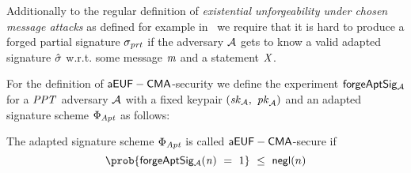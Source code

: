 \begin{definition}[$\cnstaEUFCMA$]\label{def:aeufcma}
Additionally to the regular definition of \textit{existential unforgeability under chosen message attacks} as defined for example in~\cite{vaudenay2006classical} we require that it is hard to produce a forged partial signature $\sigma_{\mathit{prt}}$ if the
adversary $\mathcal{A}$ gets to know a valid adapted signature $\hat{\sigma}$ w.r.t. some message $\mathit{m}$ and a statement $\mathit{X}$.

For the definition of $\cnstaEUFCMA$-security we define the experiment $\mathsf{forgeAptSig_{\mathcal{A}}}$ for a $\mathit{PPT}$ adversary $\mathcal{A}$ with a fixed keypair $(\mathit{sk}_{\mathcal{A}} ,~ \mathit{pk}_{\mathcal{A}})$ and an adapted signature scheme $\Phi_{\mathit{Apt}}$ as
follows:

\begin{center}
    \fbox{
    \begin{varwidth}{\textwidth}
        \procedure[linenumbering]{$\procExpForg{\varN}$} {
        \varSet \opAssign \cnstEmptySet \\
        \varMsg \opFunResult \cnstAdversary^{\procSignOracle{\cdot}{\varSecKey}{\varPubKey}}(\varPubKeyAdv) \\
        (\varWit \opSeperate \varStatement) \opFunResult \procGenR{\varSecParam} \\
        \varSigBob \opFunResult \procSignPtSingle{\varMsg}{\varSecKeyBob} \\
        \varSigAptBob \opFunResult \procAptSig{\varSigBob}{\varWit} \\
        \varSigPt_{\cnstAdversary} \opFunResult \cnstAdversary^{\procSignOracle{\cdot}{\varSecKey}{\varPubKey}}(\varSigApt) \\
        \varSigFin \opFunResult \procFinSig{\varSigPt_{\cnstAdversary}}{\varSigBob} \\
        \pcreturn (\varMsg \opNotIn \varSet \opAnd \procVerf{\varMsg}{\varSigFin}{\varPubKeyAdv \opAddPoint \varPubKey})
        }\\[2\baselineskip]
        \procedure[linenumbering]{$\procSignOracle{\varMsg}{\varPubKeyAdv}{\varRandAdv}$} {
        \varSet \opAssign \varSet \opUnion {\varMsg} \\
        (\varWit \opSeperate \varStatement) \opFunResult \procGenR{\varSecParam} \\
        \varSigPart \opFunResult \procSignPtSingle{\varMsg}{\varSecKey} \\
        \varSigApt \opFunResult \procAptSig{\varSigPart}{\varWit} \\
        \pcreturn (\varSigApt \opSeperate \varStatement)
        }\\[2\baselineskip]
    \end{varwidth}
    }
\end{center}
The adapted signature scheme $\Phi_{\mathit{Apt}}$ is called $\cnstaEUFCMA$-secure if
\[ \prob{\procExpForg{\varN} \opEq 1} \opSmEq \funNegl{n} \]
\end{definition}

